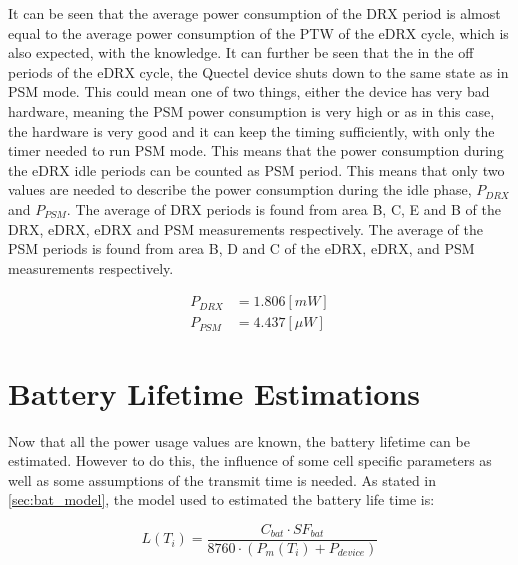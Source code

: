 It can be seen that the average power consumption of the DRX period is almost equal to the average power consumption of the PTW of the eDRX cycle, which is also expected, with the knowledge. It can further be seen that the in the off periods of the eDRX cycle, the Quectel device shuts down to the same state as in PSM mode. This could mean one of two things, either the device has very bad hardware, meaning the PSM power consumption is very high or as in this case, the hardware is very good and it can keep the timing sufficiently, with only the timer needed to run PSM mode. This means that the power consumption during the eDRX idle periods can be counted as PSM period. This means that only two values are needed to describe the power consumption during the idle phase, $P_{DRX}$ and $P_{PSM}$. The average of DRX periods is found from area B, C, E and B of the DRX, eDRX, eDRX and PSM measurements respectively. The average of the PSM periods is found from area B, D and C of the eDRX, eDRX, and PSM measurements respectively.

\begin{align}
P_{DRX} &= 1.806 [mW] \\
P_{PSM} &= 4.437 [\mu W]
\end{align}


\section{Battery Lifetime Estimations}

Now that all the power usage values are known, the battery lifetime can be estimated. However to do this, the influence of some cell specific parameters as well as some assumptions of the transmit time is needed. As stated in \autoref{sec:bat_model}, the model used to estimated the battery life time is:

\begin{equation}
L(T_i) = \frac{C_{bat}\cdot SF_{bat}}{8760\cdot (P_m(T_i) + P_{device})}
\end{equation}


